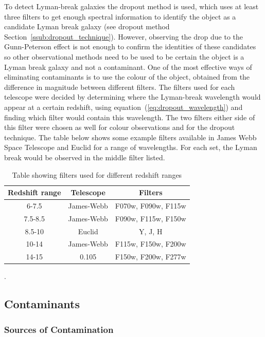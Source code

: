 	To detect Lyman-break galaxies the dropout method is used, which uses at least three filters to get enough spectral information to identify the object as a candidate Lyman break galaxy (see dropout method Section~\ref{ssub:dropout_technique}). However, observing the drop due to the Gunn-Peterson effect is not enough to confirm the identities of these candidates so other observational methods need to be used to be certain the object is a Lyman break galaxy and not a contaminant. One of the most effective ways of eliminating contaminants is to use the colour of the object, obtained from the difference in magnitude between different filters. The filters used for each telescope were decided by determining where the Lyman-break wavelength would appear at a certain redshift, using equation~(\ref{eq:dropout_wavelength}) and finding which filter would contain this wavelength. The two filters either side of this filter were chosen as well for colour observations and for the dropout technique. The table below shows some example filters available in James Webb Space Telescope and Euclid for a range of wavelengths. For each set, the Lyman break would be observed in the middle filter listed. 
	\begin{table}[ht]
		\centering
			\begin{tabular}{c|c|c}
				Redshift range &Telescope &Filters   \\
				\hline \hline
				6-7.5	   &James-Webb&  F070w, F090w, F115w \\
				7.5-8.5&James-Webb&  F090w, F115w, F150w \\
				8.5-10 &Euclid&  Y, J, H\\
				10-14  &James-Webb& F115w, F150w, F200w\\
				14-15  &0.105& F150w, F200w, F277w\\
			\end{tabular}
		\caption{Table showing filters used for different redshift ranges}
		\label{tab:colour_filters}
	\end{table}.


    \subsection{Contaminants} %
    \label{sub:Contanimants}
    	\subsubsection{Sources of Contamination} %
    	\label{ssub:sources_of_contamination}

